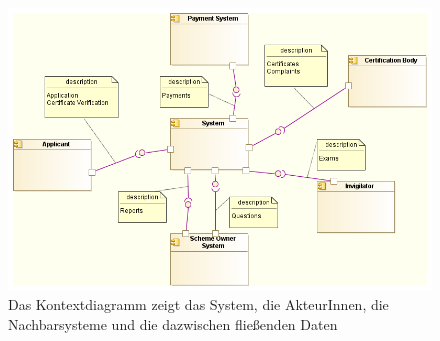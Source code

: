 \begin{figure}[H]
    \centering
    \includegraphics[scale=0.5]{uml/context.png}
    \caption{Das Kontextdiagramm zeigt das System, die AkteurInnen, die Nachbarsysteme und die dazwischen fließenden Daten}
\end{figure}